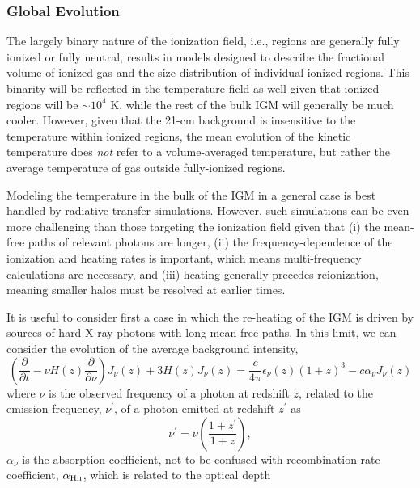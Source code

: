 \subsubsection{Global Evolution} \label{sec:temperature_global}
The largely binary nature of the ionization field, i.e., regions are generally fully ionized or fully neutral, results in models designed to describe the fractional volume of ionized gas and the size distribution of individual ionized regions. This binarity will be reflected in the temperature field as well given that ionized regions will be $\sim 10^4$ K, while the rest of the bulk IGM will generally be much cooler. However, given that the 21-cm background is insensitive to the temperature within ionized regions, the mean evolution of the kinetic temperature does \textit{not} refer to a volume-averaged temperature, but rather the average temperature of gas outside fully-ionized regions. 

Modeling the temperature in the bulk of the IGM in a general case is best handled by radiative transfer simulations. However, such simulations can be even more challenging than those targeting the ionization field given that (i) the mean-free paths of relevant photons are longer, (ii) the frequency-dependence of the ionization and heating rates is important, which means multi-frequency calculations are necessary, and (iii) heating generally precedes reionization, meaning smaller halos must be resolved at earlier times. 

It is useful to consider first a case in which the re-heating of the IGM is driven by sources of hard X-ray photons with long mean free paths. In this limit, we can consider the evolution of the average background intensity,
\begin{equation}
    \left(\frac{\partial}{\partial t} - \nu H(z) \frac{\partial}{\partial \nu} \right) J_{\nu}(z) + 3 H(z) J_{\nu}(z) =  \frac{c}{4\pi} \epsilon_{\nu}(z) (1 + z)^3 - c \alpha_{\nu} J_{\nu}(z) \label{eq:rte_diffeq}
\end{equation}
where $\nu$ is the observed frequency of a photon at redshift $z$, related to the emission frequency, $\nu^{\prime}$, of a photon emitted at redshift $z^{\prime}$ as
\begin{equation}
    \nu^{\prime} = \nu \left(\frac{1 + z^{\prime}}{1 + z}\right) , \label{eq:EmissionFrequency}
\end{equation}
$\alpha_{\nu}$ is the absorption coefficient, not to be confused with recombination rate coefficient, $\alpha_{\text{H} {\textsc{ii}}}$, which is related to the optical depth


